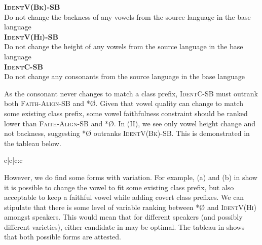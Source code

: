 \documentclass[output=paper,colorlinks,citecolor=brown,
]{langscibook}
\begin{document}
 \ea \label{ex:kinchsular:faithfulnessconstraints}
\begin{xlist}

\ex \textbf{\textsc{IdentV(Bk)-SB}}\\ 
        Do not change the backness of any vowels from the source language in the base language\\

\ex \textbf{\textsc{IdentV(Hi)-SB}}\\
        Do not change the height of any vowels from the source language in the base language\\ 

 \ex \textbf{\textsc{Ident}C-SB} \\
        Do not change any consonants from the source language in the base language

\end{xlist}

\z 

As the consonant never changes to match a class prefix, \textsc{IdentC-SB} must outrank both \textsc{Faith-Align-SB} and *{Ø}. Given that vowel quality can change to match some existing class prefix, some vowel faithfulness constraint should be ranked lower than \textsc{Faith-Align-SB} and *{Ø}. In  (\textsc{II}), we see only vowel height change and not backness, suggesting *{Ø} outranks \textsc{IdentV(Bk)-SB}. This is demonstrated in the tableau below.

\begin{table}
\ShadingOn
  \caption{Evaluation of /kilo/}
  \label{tab:kinchsular:kilotableau2}
  
\begin{tableau}{c|c|c:c} 
 
 
 \vio{} \vio{} \vio{*} \vio{} 
 \vio{*!} \vio{}  \vio{} \vio{} 
 \vio{*!} \vio{}  \vio{} \vio{} 
\end{tableau}
\end{table}

However, we do find some forms with variation. For example, (a) and (b) in  show it is possible to change the vowel to fit some existing class prefix, but also acceptable to keep a faithful vowel while adding covert class prefixes. We can stipulate that there is some level of variable ranking between *{Ø} and \textsc{IdentV(Hi)} amongst speakers. This would mean that for different speakers (and possibly different varieties), either candidate in  may be optimal. The tableau in  shows that both possible forms are attested.  
\end{document}

